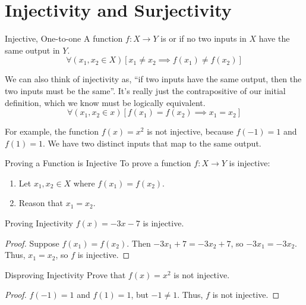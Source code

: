 \section{Injectivity and Surjectivity}

\begin{dfnbox}{Injective, One-to-one}{}
    A function $f : X \to Y$ is  or  if no two inputs in $X$ have the same output in $Y$.
    \tcblower
    \[ \forall (x_1, x_2 \in X) \left[ x_1 \neq x_2 \implies f\left(x_1\right) \neq f\left(x_2\right) \right] \]
\end{dfnbox}

We can also think of injectivity as, ``if two inputs have the same output, then the two inputs must be the same''. It's really just the contrapositive of our initial definition, which we know must be logically equivalent.
\[ \forall (x_1, x_2 \in x) \left[ f(x_1) = f(x_2) \implies x_1 = x_2 \right] \]

For example, the function $f(x) = x^2$ is not injective, because $f(-1) = 1$ and $f(1) = 1$. We have two distinct inputs that map to the same output.

\begin{tecbox}{Proving a Function is Injective}{}
    To prove a function $f : X \to Y$ is injective:
    \begin{enumerate}
        \item Let $x_1, x_2 \in X$ where $f(x_1) = f(x_2)$.
        \item Reason that $x_1 = x_2$.
    \end{enumerate}
\end{tecbox}

\begin{exbox}{Proving Injectivity}{}
    $f(x) = -3x-7$ is injective.
    \tcblower
    \begin{proof}
        Suppose $f(x_1) = f(x_2)$. Then $-3x_1+7 = -3x_2+7$, so $-3x_1 = -3x_2$. Thus, $x_1 = x_2$, so $f$ is injective.
    \end{proof}
\end{exbox}

\begin{exbox}{Disproving Injectivity}{}
    Prove that $f(x)=x^2$ is not injective.
    \tcblower
    \begin{proof}
        $f(-1) = 1$ and $f(1) = 1$, but $-1 \neq 1$. Thus, $f$ is not injective.
    \end{proof}
\end{exbox}

